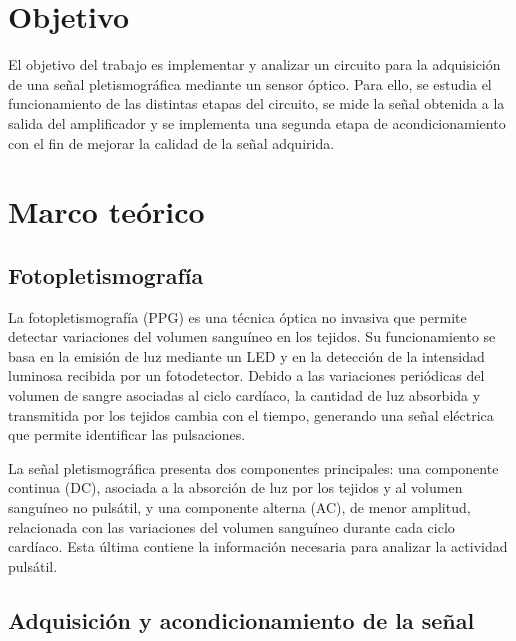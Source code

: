 \documentclass[10pt]{article}
\begin{document}
\thispagestyle{fancy}

\newpage
\tableofcontents
\thispagestyle{fancy}

\newpage


\section{Objetivo}

El objetivo del trabajo es implementar y analizar un circuito para la adquisición de una señal pletismográfica mediante un sensor óptico. Para ello, se estudia el funcionamiento de las distintas etapas del circuito, se mide la señal obtenida a la salida del amplificador y se implementa una segunda etapa de acondicionamiento con el fin de mejorar la calidad de la señal adquirida.


\section{Marco teórico}

\subsection{Fotopletismografía}

La fotopletismografía (PPG) es una técnica óptica no invasiva que permite detectar variaciones del volumen sanguíneo en los tejidos. Su funcionamiento se basa en la emisión de luz mediante un LED y en la detección de la intensidad luminosa recibida por un fotodetector. Debido a las variaciones periódicas del volumen de sangre asociadas al ciclo cardíaco, la cantidad de luz absorbida y transmitida por los tejidos cambia con el tiempo, generando una señal eléctrica que permite identificar las pulsaciones.

La señal pletismográfica presenta dos componentes principales: una componente continua (DC), asociada a la absorción de luz por los tejidos y al volumen sanguíneo no pulsátil, y una componente alterna (AC), de menor amplitud, relacionada con las variaciones del volumen sanguíneo durante cada ciclo cardíaco. Esta última contiene la información necesaria para analizar la actividad pulsátil.

\subsection{Adquisición y acondicionamiento de la señal}
\end{document}
